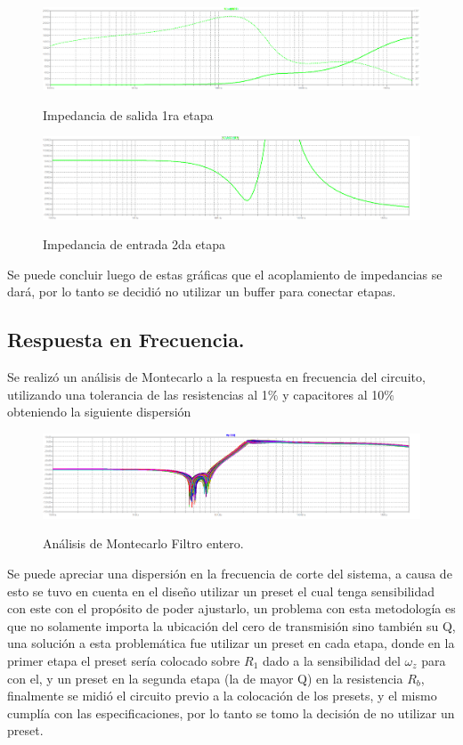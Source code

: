 \begin{figure}[H]
	\centering
	\includegraphics[width=\textwidth]{Imagenes-Ej3/ZoutE1.png}
	\label{fig:zoute1}
	\caption{Impedancia de salida 1ra etapa}
\end{figure}

\begin{figure}[H]
	\centering
	\includegraphics[width=\textwidth]{Imagenes-Ej3/ZinE2.png}
	\label{fig:zine2}
	\caption{Impedancia de entrada 2da etapa}
\end{figure}
Se puede concluir luego de estas gráficas que el acoplamiento de impedancias se dará, por lo tanto se decidió no utilizar un  buffer para conectar etapas.
\subsection{Respuesta en Frecuencia.}
Se realizó un análisis de Montecarlo a la respuesta en frecuencia del circuito, utilizando una tolerancia de las resistencias al 1$\%$ y capacitores al 10$\%$ obteniendo la siguiente dispersión
\begin{figure}[H]
	\centering
	\includegraphics[width=\textwidth]{Imagenes-Ej3/mcsedra.png}
	\label{fig:mcsedra}
	\caption{Análisis de Montecarlo Filtro entero.}
\end{figure}
Se puede apreciar una dispersión en la frecuencia de corte del sistema, a causa de esto se tuvo en cuenta en el diseño utilizar un preset el cual tenga sensibilidad con este con el propósito de poder ajustarlo, un problema con esta metodología es que no solamente importa la ubicación del cero de transmisión sino también su Q, una solución a esta problemática fue utilizar un preset en cada etapa, donde en la primer etapa el preset sería colocado sobre $R_1$ dado a la sensibilidad del $\omega_z$ para con el, y un preset en la segunda etapa (la de mayor Q) en la resistencia  $R_b$, finalmente se midió el circuito previo a la colocación de los presets, y el mismo cumplía con las especificaciones, por lo tanto se tomo la decisión de no utilizar un preset. 
